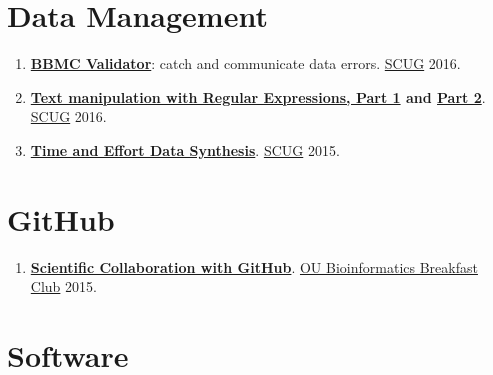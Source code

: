 \documentclass[]{book}
\providecommand{\tightlist}{%
  \setlength{\itemsep}{0pt}\setlength{\parskip}{0pt}}
\begin{document}
\hypertarget{data-management}{%
\section{Data Management}\label{data-management}}

\begin{enumerate}
\def\labelenumi{\arabic{enumi}.}
\tightlist
\item
  \textbf{\href{https://rawgit.com/OuhscBbmc/StatisticalComputing/master/2016-presentations/11-november/beasley-scug-validator-2016-11.html\#/}{BBMC Validator}}: catch and communicate data errors. \href{https://github.com/OuhscBbmc/StatisticalComputing}{SCUG} 2016.
\item
  \textbf{\href{https://rawgit.com/OuhscBbmc/StatisticalComputing/master/2016-presentations/02-february/beasley-scug-regex-part-1-2016-02.html}{Text manipulation with Regular Expressions, Part 1} and \href{https://rawgit.com/OuhscBbmc/StatisticalComputing/master/2016-presentations/05-may/beasley-scug-regex-part-2-2016-05.html\#/}{Part 2}}. \href{https://github.com/OuhscBbmc/StatisticalComputing}{SCUG} 2016.
\item
  \textbf{\href{https://rawgit.com/wibeasley/RAnalysisSkeleton/master/documentation/time-and-effort-synthesis.html\#/}{Time and Effort Data Synthesis}}. \href{https://github.com/OuhscBbmc/StatisticalComputing}{SCUG} 2015.
\end{enumerate}

\hypertarget{github-1}{%
\section{GitHub}\label{github-1}}

\begin{enumerate}
\def\labelenumi{\arabic{enumi}.}
\tightlist
\item
  \textbf{\href{https://github.com/OuhscBbmc/BbmcResources/blob/master/Publications/Presentation2015-08-GitHub/beasley-github-2015-08.md}{Scientific Collaboration with GitHub}}. \href{https://github.com/bwawrik/MBIO5810}{OU Bioinformatics Breakfast Club} 2015.
\end{enumerate}

\hypertarget{software}{%
\section{Software}\label{software}}
\end{document}
